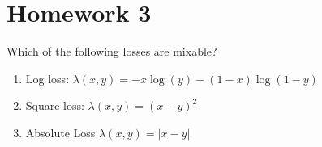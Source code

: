 \documentclass[12pt]{article}
\begin{document}
\section*{Homework 3}

Which of the following losses are mixable?
\begin{enumerate}
\item Log loss: $\lambda(x, y) = -x \log(y)-(1-x)\log(1-y)$
\item Square loss: $\lambda(x,y)=(x-y)^2$
\item Absolute Loss $\lambda(x,y)=|x-y|$
\end{enumerate}
\end{document}
